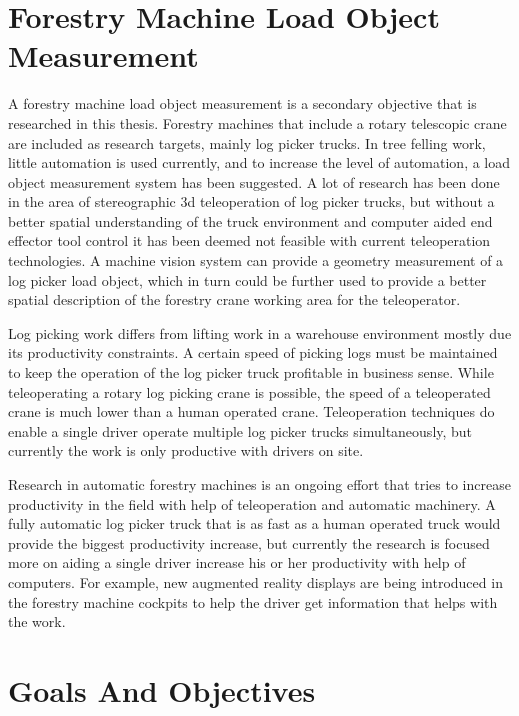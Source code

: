 \documentclass[12pt,a4paper,oneside,pdftex]{report}
\begin{document}
\section{Forestry Machine Load Object Measurement}
\label{section:forestry_machines_cranes}

A forestry machine load object measurement is a secondary objective that is researched in this thesis. Forestry machines that include a rotary telescopic crane are included as research targets, mainly log picker trucks. In tree felling work, little automation is used currently, and to increase the level of automation, a load object measurement system has been suggested. A lot of research has been done in the area of stereographic 3d teleoperation of log picker trucks, but without a better spatial understanding of the truck environment and computer aided end effector tool control it has been deemed not feasible with current teleoperation technologies. A machine vision system can provide a geometry measurement of a log picker load object, which in turn could be further used to provide a better spatial description of the forestry crane working area for the teleoperator. 

Log picking work differs from lifting work in a warehouse environment mostly due its productivity constraints. A certain speed of picking logs must be maintained to keep the operation of the log picker truck profitable in business sense. While teleoperating a rotary log picking crane is possible, the speed of a teleoperated crane is much lower than a human operated crane. Teleoperation techniques do enable a single driver operate multiple log picker trucks simultaneously, but currently the work is only productive with drivers on site. 

Research in automatic forestry machines is an ongoing effort that tries to increase productivity in the field with help of teleoperation and automatic machinery. A fully automatic log picker truck that is as fast as a human operated truck would provide the biggest productivity increase, but currently the research is focused more on aiding a single driver increase his or her productivity with help of computers. For example, new augmented reality displays are being introduced in the forestry machine cockpits to help the driver get information that helps with the work. 

\section{Goals And Objectives}
\label{section:goals_and_objectives}
\end{document}
